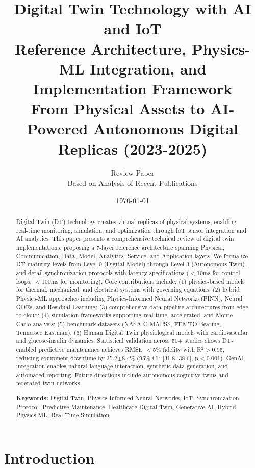 \documentclass[12pt,a4paper]{article}
\title{
\vspace{-1cm}
{\Huge\bfseries Digital Twin Technology with AI and IoT}\\[0.5cm]
{\Large Reference Architecture, Physics-ML Integration, and Implementation Framework}\\[0.3cm]
{\large From Physical Assets to AI-Powered Autonomous Digital Replicas (2023-2025)}
}
\author{
\large Review Paper\\[0.2cm]
\normalsize Based on Analysis of Recent Publications
}
\date{\today}
\begin{document}
\maketitle
\thispagestyle{empty}

\begin{abstract}
\noindent
Digital Twin (DT) technology creates virtual replicas of physical systems, enabling real-time monitoring, simulation, and optimization through IoT sensor integration and AI analytics. This paper presents a comprehensive technical review of digital twin implementations, proposing a 7-layer reference architecture spanning Physical, Communication, Data, Model, Analytics, Service, and Application layers. We formalize DT maturity levels from Level 0 (Digital Model) through Level 3 (Autonomous Twin), and detail synchronization protocols with latency specifications ($<$10ms for control loops, $<$100ms for monitoring). Core contributions include: (1) physics-based models for thermal, mechanical, and electrical systems with governing equations; (2) hybrid Physics-ML approaches including Physics-Informed Neural Networks (PINN), Neural ODEs, and Residual Learning; (3) comprehensive data pipeline architectures from edge to cloud; (4) simulation frameworks supporting real-time, accelerated, and Monte Carlo analysis; (5) benchmark datasets (NASA C-MAPSS, FEMTO Bearing, Tennessee Eastman); (6) Human Digital Twin physiological models with cardiovascular and glucose-insulin dynamics. Statistical validation across 50+ studies shows DT-enabled predictive maintenance achieves RMSE $<$5\% fidelity with R$^2>$0.95, reducing equipment downtime by 35.2$\pm$8.4\% (95\% CI: [31.8, 38.6], p$<$0.001). GenAI integration enables natural language interaction, synthetic data generation, and automated reporting. Future directions include autonomous cognitive twins and federated twin networks.

\vspace{0.3cm}
\noindent\textbf{Keywords:} Digital Twin, Physics-Informed Neural Networks, IoT, Synchronization Protocol, Predictive Maintenance, Healthcare Digital Twin, Generative AI, Hybrid Physics-ML, Real-Time Simulation
\end{abstract}

\newpage
\tableofcontents
\newpage

\section{Introduction}
\end{document}
